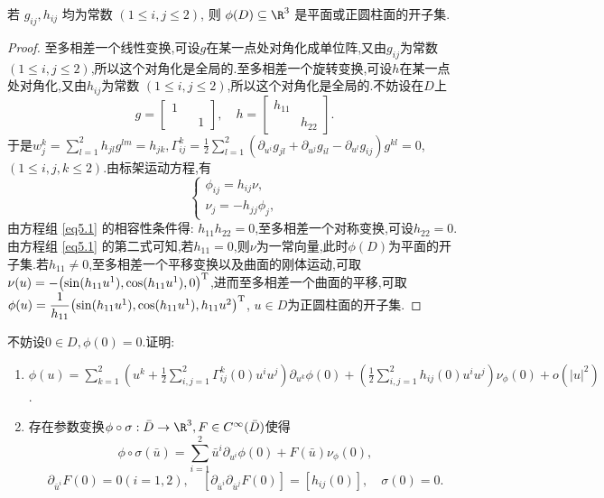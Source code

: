 	\begin{excise}\label{5.2}
		若 $g_{ij}, h_{ij}$ 均为常数 $(1\leqslant i,j \leqslant 2)$, 则 $\phi(D) \subseteq \R^3$ 
		是平面或正圆柱面的开子集.
	\end{excise}
	\begin{proof}
		至多相差一个线性变换,可设$g$在某一点处对角化成单位阵,又由$g_{ij}$为常数 $(1\leqslant i,j \leqslant 2)$,所以这个对角化是全局的.至多相差一个旋转变换,可设$h$在某一点处对角化,又由$h_{ij}$为常数 $(1\leqslant i,j \leqslant 2)$,所以这个对角化是全局的.不妨设在$D$上
		$$
		g=
		\begin{bmatrix}
			1& & \\
			 & &1
		\end{bmatrix},\quad h=
		\begin{bmatrix}
			h_{11}&\\
			&h_{22}
		\end{bmatrix}.
		$$
		于是$\displaystyle w_{j}^{k}=\sum_{l=1}^{2}h_{jl}g^{lm}=h_{jk}, \Gamma_{ij}^{k}=\frac{1}{2}\sum_{l=1}^{2}(\partial_{u^{i}}g_{jl}+\partial_{u^{j}}g_{il}-\partial_{u^{l}}g_{ij})g^{kl}=0$, $(1\leqslant i,j,k \leqslant 2)$.由标架运动方程,有
		\begin{equation}\label{eq5.1}
			\begin{cases}
				\phi_{ij}=h_{ij}\nu,\\
				\nu_{j}=-h_{jj}\phi_{j},
			\end{cases}
		\end{equation}
		由方程组 \eqref{eq5.1} 的相容性条件得: $h_{11}h_{22}=0$,至多相差一个对称变换,可设$h_{22}=0$.由方程组 \eqref{eq5.1} 的第二式可知,若$h_{11}=0$,则$\nu$为一常向量,此时$\phi(D)$为平面的开子集.若$h_{11}\neq0$,至多相差一个平移变换以及曲面的刚体运动,可取$\nu(u)=-\bigl(\sin (h_{11}u^{1}),\cos (h_{11}u^{1}),0\bigr)^{\mathrm{T}}$,进而至多相差一个曲面的平移,可取$\phi(u)=\dfrac{1}{h_{11}}\bigl(\sin (h_{11}u^{1}),\cos (h_{11}u^{1}),h_{11}u^{2}\bigr)^{\mathrm{T}}$, $u\in D$为正圆柱面的开子集.
	\end{proof}
	\begin{excise}\label{5.3}
		不妨设$0\in D, \phi(0)=0$.证明:
		\begin{enumerate}[label=(\roman*)]
			\item\label{5.3.1} $\displaystyle \phi(u)=\sum_{k=1}^{2}\left( u^{k}+\frac{1}{2}\sum_{i,j=1}^{2}\Gamma_{ij}^{k}(0)u^{i}u^{j} \right)\partial_{u^{k}}\phi(0)+\left( \frac{1}{2}\sum_{i,j=1}^{2}h_{ij}(0)u^{i}u^{j} \right)\nu_{\phi}(0)+o(|u|^{2})$.
			\item 存在参数变换$\phi\circ\sigma:\widebar{D}\to\R^{3},F\in C^{\infty}(\widebar{D})$使得
			$$
			\phi\circ\sigma(\bar{u})=\sum_{i=1}^{2}\bar{u}^{i}\partial_{u^{i}}\phi(0)+F(\bar{u})\nu_{\phi}(0),
			$$
			$$
			\partial_{\bar{u}^{i}}F(0)=0(i=1,2),\quad [\partial_{\bar{u}^{i}}\partial_{\bar{u}^{j}}F(0)]=[h_{ij}(0)],\quad \sigma(0)=0.
			$$
		\end{enumerate}
	\end{excise}
